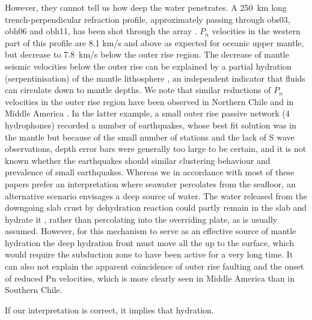 \documentclass[reviewcopy]{elsarticle}
\begin{document}
\begin{enumerate}
  However,
they cannot tell us how deep the water penetrates.
A 250~km long
trench-perpendicular  refraction
profile, approximately passing through obs03, obh06 and obh11, has
been shot through the array \citep{contreras-reyes07}. $P_n$
velocities in the western part of this profile are 8.1 km/s and above
as expected for oceanic upper mantle, but decrease to 7.8~km/s below
the outer rise region.
The decrease of mantle seismic velocities below the outer rise can be
explained by a partial hydration (serpentinisation) of the mantle lithosphere
\citep{contreras-reyes07}, an independent indicator that fluids can
circulate down to mantle depths.   We note that similar reductions of $P_n$
velocities in the outer rise region have been observed in Northern
Chile \citep{ranero04} and in Middle
America \citep{grevemeyer07}.  In the latter example, a small outer
rise passive network (4 hydrophones) recorded a number of earthquakes, whose best fit
solution was in the mantle but because of the small number of stations
and the lack of S wave observations, depth error bars were generally
too large to be certain, and it is not known whether the earthquakes
should similar clustering behaviour and prevalence of small
earthquakes.
 Whereas we in accordance with most of these papers
prefer an interpretation where seawater percolates from the seafloor,
an alternative scenario envisages a deep source of water. The water
released from the downgoing slab crust by dehydration reaction could
partly remain in the slab and hydrate it \citep{abers03,robin07abs},
rather than percolating into the overriding plate, as is usually
assumed.  However, for this mechanism to serve as an effective source
of mantle hydration the deep hydration front must move all the up to
the surface, which would require the subduction zone to have been
active for a very long time.  It can also not explain the apparent
coincidence of outer rise faulting and the onset of reduced Pn
velocities, which is more clearly seen in Middle
America \citep{grevemeyer07} than in Southern Chile.
\end{enumerate}
If our interpretation is correct, it implies that hydration.
\end{document}

